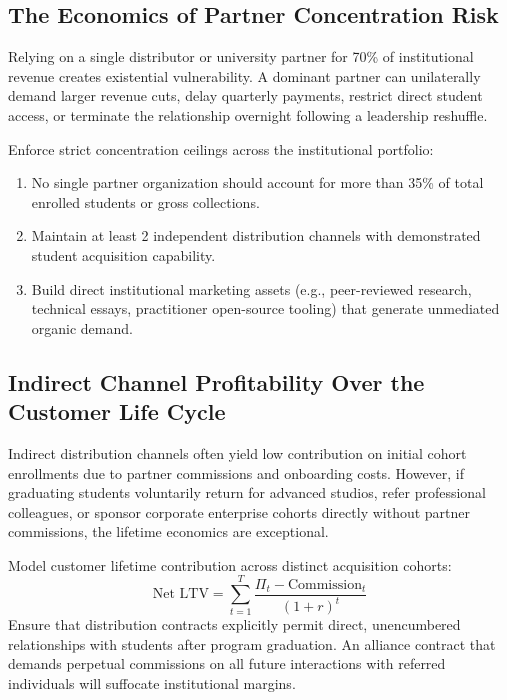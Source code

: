 \subsection{The Economics of Partner Concentration Risk}
\label{sec:partner_concentration_risk}

Relying on a single distributor or university partner for 70\% of institutional revenue creates existential vulnerability. A dominant partner can unilaterally demand larger revenue cuts, delay quarterly payments, restrict direct student access, or terminate the relationship overnight following a leadership reshuffle.

Enforce strict concentration ceilings across the institutional portfolio:
\begin{enumerate}
\item No single partner organization should account for more than 35\% of total enrolled students or gross collections.
\item Maintain at least 2 independent distribution channels with demonstrated student acquisition capability.
\item Build direct institutional marketing assets (e.g., peer-reviewed research, technical essays, practitioner open-source tooling) that generate unmediated organic demand.
\end{enumerate}

\subsection{Indirect Channel Profitability Over the Customer Life Cycle}
\label{sec:indirect_channel_lifecycle_profitability}

Indirect distribution channels often yield low contribution on initial cohort enrollments due to partner commissions and onboarding costs. However, if graduating students voluntarily return for advanced studios, refer professional colleagues, or sponsor corporate enterprise cohorts directly without partner commissions, the lifetime economics are exceptional.

Model customer lifetime contribution across distinct acquisition cohorts:
\begin{equation}
\label{eq:channel_cohort_ltv}
\text{Net LTV} = \sum_{t=1}^{T} \frac{\Pi_t - \text{Commission}_t}{(1 + r)^t}
\end{equation}
Ensure that distribution contracts explicitly permit direct, unencumbered relationships with students after program graduation. An alliance contract that demands perpetual commissions on all future interactions with referred individuals will suffocate institutional margins.

